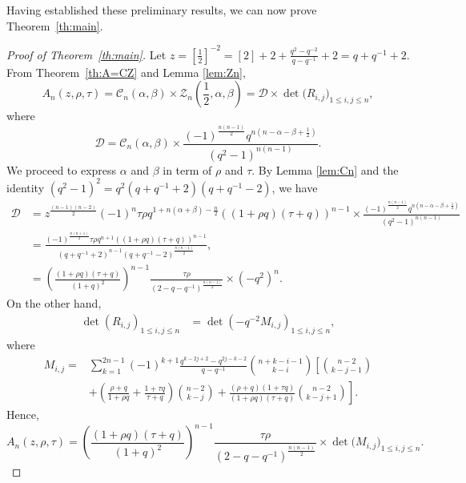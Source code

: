 \documentclass[12pt, a4paper]{amsart} %
\numberwithin{equation}{section}
\begin{document}
Having established these preliminary results, we can now prove Theorem~\ref{th:main}.

\begin{proof}[Proof of Theorem~\ref{th:main}]
Let $z=[\frac{1}{2}]^{-2}=[2]+2+\frac{q^2-q^{-2}}{q-q^{-1}}+2=q+q^{-1}+2$.
From Theorem~\ref{th:A=CZ} and Lemma \ref{lem:Zn},
\begin{equation*}
	A_n(z,\rho,\tau) 
	= \mathcal{C}_n(\alpha, \beta) \times \mathcal{Z}_n(\frac{1}{2},\alpha,\beta)
	= \mathcal{D} \times \det{\bigl(R_{i,j}\bigr)_{1 \le i,j \le n}},
\end{equation*}
where
$$
\mathcal{D} = \mathcal{C}_n(\alpha, \beta) \times \frac{(-1)^{\frac{n(n-1)}{2}}q^{n(n-\alpha-\beta+\frac{1}{2})}}{(q^2-1)^{n(n-1)}}.
$$
We proceed to express $\alpha$ and $\beta$ in term of $\rho$ and $\tau$.
By Lemma \ref{lem:Cn} and the identity $(q^2-1)^2=q^2(q+q^{-1}+2)(q+q^{-1}-2)$, we have
\begin{align*}
	\mathcal{D}
	&= 
	z^{\frac{(n-1)(n-2)}{2}} { (-1)^{n} \tau \rho q^{1+n(\alpha+\beta) -\frac{n}{2}}((1+\rho q)(\tau +q))^{n-1}  }
	\times \frac{(-1)^{\frac{n(n-1)}{2}}q^{n(n-\alpha-\beta+\frac{1}{2})}}{(q^2-1)^{n(n-1)}}\\
	 &= \frac{ (-1)^{\frac{n(n+1)}{2}} \tau \rho q^{n+1}((1+\rho q)(\tau +q))^{n-1}  }{
		 (q+q^{-1}+2 )^{n-1} (q+q^{-1}-2)^{\frac{n(n-1)}{2}}},\\
	 &= \left(\frac{ (1+\rho q)(\tau +q) }{(1+q)^2} \right)^{n-1} \frac{ \tau \rho }{
		 (2-q-q^{-1})^{\frac{n(n-1)}{2}}} \times (-q^2)^n.
\end{align*}
On the other hand, 
	\begin{align*}
		\det(R_{i,j})_{1\leq i, j\leq n} &= \det(-q^{-2} M_{i,j})_{1\leq i,j\leq n},
	\end{align*}
where
\begin{align*}
    M_{i,j}= &\sum_{k=1}^{2n-1}(-1)^{k+1}\frac{q^{k-2j+2}-q^{2j-k-2}}{q-q^{-1}}\binom{n+k-i-1}{k-i}\left[\binom{n-2}{k-j-1} \right.\\
     &\left. +(\frac{\rho +q}{1+\rho q}+\frac{1+\tau q}{\tau +q})\binom{n-2}{k-j}+\frac{(\rho +q)(1+\tau q)  }{(1+\rho q)(\tau +q) } \binom{n-2}{k-j+1}  \right].
\end{align*}
Hence,
	\begin{equation}\label{eq:AnM}
	A_n(z,\rho,\tau) 
	= 
	 \left(\frac{ (1+\rho q)(\tau +q) }{(1+q)^2} \right)^{n-1} \frac{ \tau \rho }{
		 (2-q-q^{-1})^{\frac{n(n-1)}{2}}} 
	 \times \det{\bigl(M_{i,j}\bigr)_{1 \le i,j \le n}}.
\end{equation}





\end{proof}
\end{document}
